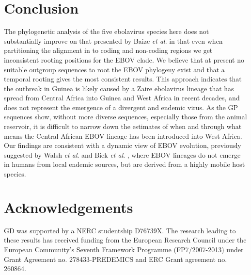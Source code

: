 \documentclass[11pt,oneside,letterpaper]{article}
\begin{document}
\section*{Conclusion}
The phylogenetic analysis of the five ebolavirus species here does not substantially improve on that presented by Baize \textit{et al}. \cite{baize2014} in that even when partitioning the alignment in to coding and non-coding regions we get inconsistent rooting positions for the EBOV clade.  
We believe that at present no suitable outgroup sequences to root the EBOV phylogeny exist and that a temporal rooting gives the most consistent results.
This approach indicates that the outbreak in Guinea is likely caused by a Zaire ebolavirus lineage that has spread from Central Africa into Guinea and West Africa in recent decades, and does not represent the emergence of a divergent and endemic virus.
As the GP sequences show, without more diverse sequences, especially those from the animal reservoir, it is difficult to narrow down the estimates of when and through what means the Central African EBOV lineage has been introduced into West Africa.
Our findings are consistent with a dynamic view of EBOV evolution, previously suggested by Walsh \textit{et al}. \cite{walsh2005} and Biek \textit{et al}. \cite{biek2006}, where EBOV lineages do not emerge in humans from local endemic sources, but are derived from a highly mobile host species.

\section*{Acknowledgements}
GD was supported by a NERC studentship D76739X.
The research leading to these results has received funding from the European Research Council under the European Community's Seventh Framework Programme (FP7/2007-2013) under Grant Agreement no. 278433-PREDEMICS and ERC Grant agreement no. 260864.



\end{document}
